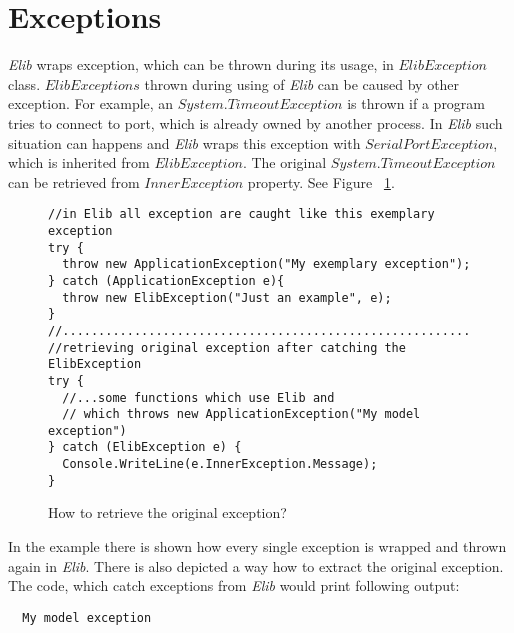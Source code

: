 \section*{Exceptions}
  {\it Elib} wraps exception, which can be thrown during its usage, in $ ElibException$ class.
  $ElibExceptions$ thrown during using of {\it Elib} can be caused by other exception.
  For example, an $System.TimeoutException$ is thrown if a program tries to connect to port, 
  which is already owned by another process.
  In {\it Elib} such situation can happens and {\it Elib} wraps this exception
  with $SerialPortException$, which is inherited from $ElibException$.
  The original $System.TimeoutException$ can be retrieved from $InnerException$ property.
  See Figure ~\ref{exceptionuse}.

\begin{figure}[!hbp]
\begin{lstlisting}
//in Elib all exception are caught like this exemplary exception
try {
  throw new ApplicationException("My exemplary exception");
} catch (ApplicationException e){
  throw new ElibException("Just an example", e);
}
//........................................................................
//retrieving original exception after catching the ElibException
try {
  //...some functions which use Elib and 
  // which throws new ApplicationException("My model exception")
} catch (ElibException e) {
  Console.WriteLine(e.InnerException.Message);
}
\end{lstlisting}
\caption{How to retrieve the original exception?}
\label{exceptionuse}
\end{figure}

  In the example there is shown how every single exception is wrapped 
  and thrown again in {\it Elib}.
  There is also depicted a way how to extract the original exception.
  The code, which catch exceptions from {\it Elib} would print following output:
\begin{verbatim}
  My model exception
\end{verbatim}

